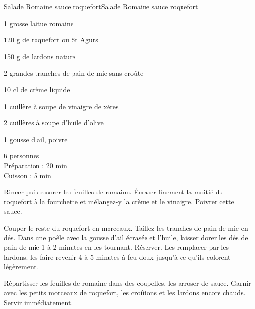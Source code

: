 \begin{recette}{Salade Romaine sauce roquefort}{Salade Romaine sauce roquefort}

\begin{ingredients}
1 grosse laitue romaine\par
120 g de roquefort ou St Agurs\par
150 g de lardons nature\par
2 grandes tranches de pain de mie sans croûte\par
10 cl de crème liquide\par
1 cuillère à soupe de vinaigre de xéres\par
2 cuillères à soupe d'huile d'olive\par
1 gousse d'ail, poivre\par
\end{ingredients}

\begin{infos}
6 personnes	\\
Préparation : 20 min\\
Cuisson : 5 min\\
\end{infos}

\begin{etapes}
\item Rincer puis essorer les feuilles de romaine. Écraser finement la moitié du roquefort à la fourchette et mélangez-y la crème et le vinaigre. Poivrer cette sauce.
\item Couper le reste du roquefort en morceaux. Taillez les tranches de pain de mie en dés. Dans une poêle avec la gousse d'ail écrasée et l'huile, laisser dorer les dés de pain de mie 1 à 2 minutes en les tournant. Réserver. Les remplacer par les lardons. les faire revenir 4 à 5 minutes à feu doux jusqu'à ce qu'ils colorent légèrement.
\item Répartisser les feuilles de romaine dans des coupelles, les arroser de sauce. Garnir avec les petits morceaux de roquefort, les croûtons et les lardons encore chauds. Servir immédiatement.
\end{etapes}

\end{recette}
